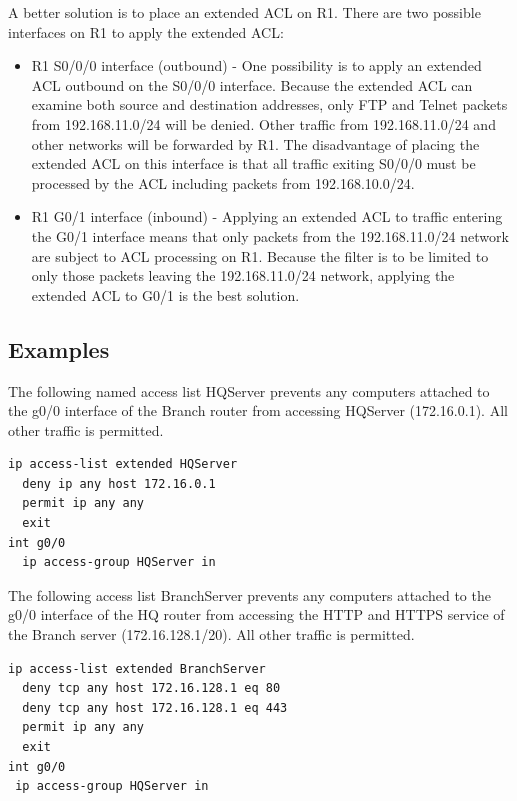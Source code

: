 A better solution is to place an extended ACL on R1. There are two possible interfaces on R1 to apply the extended ACL:

\begin{itemize}
\item R1 S0/0/0 interface (outbound) - One possibility is to apply an extended ACL outbound on the S0/0/0 interface. Because the extended ACL can examine both source and destination addresses, only FTP and Telnet packets from 192.168.11.0/24 will be denied. Other traffic from 192.168.11.0/24 and other networks will be forwarded by R1. The disadvantage of placing the extended ACL on this interface is that all traffic exiting S0/0/0 must be processed by the ACL including packets from 192.168.10.0/24.

\item R1 G0/1 interface (inbound) - Applying an extended ACL to traffic entering the G0/1 interface means that only packets from the 192.168.11.0/24 network are subject to ACL processing on R1. Because the filter is to be limited to only those packets leaving the 192.168.11.0/24 network, applying the extended ACL to G0/1 is the best solution.
\end{itemize}

\subsection{Examples}

\begin{example}
The following named access list HQServer prevents any computers attached to the g0/0 interface of the Branch router from accessing HQServer (172.16.0.1). All other traffic is permitted.
\begin{verbatim}
ip access-list extended HQServer
  deny ip any host 172.16.0.1
  permit ip any any
  exit
int g0/0
  ip access-group HQServer in
\end{verbatim}
\end{example}

\begin{example}
The following access list BranchServer prevents any computers attached to the g0/0 interface of the HQ router from accessing the HTTP and HTTPS service of the Branch server (172.16.128.1/20). All other traffic is permitted.
\begin{verbatim}
ip access-list extended BranchServer
  deny tcp any host 172.16.128.1 eq 80
  deny tcp any host 172.16.128.1 eq 443
  permit ip any any
  exit
int g0/0
 ip access-group HQServer in
\end{verbatim}
\end{example}

